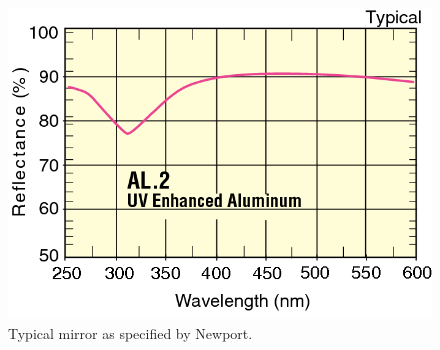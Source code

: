 \begin{figure}[ht]
    \centering
    \includegraphics[width=1.0\linewidth]{images/Ref_Mirror}
    \caption{Typical mirror as specified by Newport.}
    \label{fig:Ref_Mirror}
\end{figure}
 

